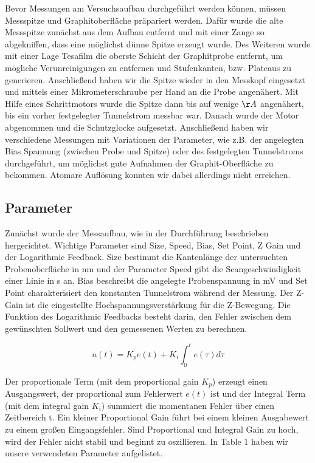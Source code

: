 \documentclass[10pt,a4paper]{article}
\begin{document}
	Bevor Messungen am Versuchsaufbau durchgeführt werden können, müssen Messspitze und Graphitoberfläche präpariert werden. Dafür wurde die alte Messspitze zunächst aus dem Aufbau entfernt und mit einer Zange so abgekniffen, dass eine möglichst dünne Spitze erzeugt wurde. Des Weiteren wurde mit einer Lage Tesafilm die oberste Schicht der Graphitprobe entfernt, um mögliche Verunreinigungen zu entfernen und Stufenkanten, bzw. Plateaus zu generieren. Anschließend haben wir die Spitze wieder in den Messkopf eingesetzt und mittels einer Mikrometerschraube per Hand an die Probe angenähert. Mit Hilfe eines Schrittmotors wurde die Spitze dann bis auf wenige $\AA$ angenähert, bis ein vorher festgelegter Tunnelstrom messbar war. Danach wurde der Motor abgenommen und die Schutzglocke aufgesetzt. Anschließend haben wir verschiedene Messungen mit Variationen der Parameter, wie z.B. der angelegten Bias Spannung (zwischen Probe und Spitze) oder des festgelegten Tunnelstroms durchgeführt, um möglichst gute Aufnahmen der Graphit-Oberfläche zu bekommen. Atomare Auflösung konnten wir dabei allerdings nicht erreichen.
	
	\subsection{Parameter}
	
	Zunächst wurde der Messaufbau, wie in der Durchführung beschrieben hergerichtet. Wichtige Parameter sind Size, Speed, Bias, Set Point, Z Gain und der Logarithmic Feedback. Size bestimmt die Kantenlänge der untersuchten Probenoberfläche in nm und der Parameter Speed gibt die Scangeschwindigkeit einer Linie in s an. Bias beschreibt die angelegte Probenspannung in mV und Set Point charakterisiert den konstanten Tunnelstrom während der Messung. Der Z-Gain ist die eingestellte Hochspannungsverstärkung für die Z-Bewegung. Die Funktion des Logarithmic Feedbacks besteht darin, den Fehler zwischen dem gewünschten Sollwert und den gemessenen Werten zu berechnen. 
	
	$$u(t) = K_{p}e(t)+K_{i}  \int_{0}^{t}e(\tau)d\tau$$
	
	Der proportionale Term (mit dem proportional gain $K_{p}$) erzeugt einen Ausgangswert, der proportional zum Fehlerwert $e(t)$ ist und der Integral Term (mit dem integral gain $K_{i}$) summiert die momentanen Fehler über einen Zeitbereich t. Ein kleiner Proportional Gain führt bei einem kleinen Ausgabewert zu einem großen Eingangsfehler.  Sind Proportional und Integral Gain zu hoch, wird der Fehler nicht stabil und beginnt zu oszillieren. In Table 1 haben wir unsere verwendeten Parameter aufgelistet.
	
\end{document}
